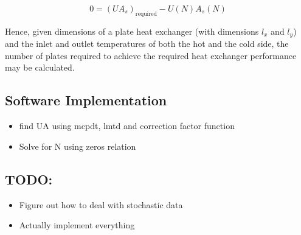 \documentclass[12pt,letterpaper]{article}
\begin{document}
\begin{equation}
\label{eq:zeros}
0 = (UA_s)_{\textrm{required}} - U(N) A_s(N)
\end{equation}

Hence, given dimensions of a plate heat exchanger (with dimensions \(l_x\) and \(l_y\)) and the inlet and outlet temperatures of both the hot and the cold side, the number of plates required to achieve the required heat exchanger performance may be calculated.

\subsection{Software Implementation}

\begin{itemize}
\item find UA using mcpdt, lmtd and correction factor function
\item Solve for N using zeros relation
\end{itemize}

\subsection{TODO:}
\begin{itemize}
\item Figure out how to deal with stochastic data
\item Actually implement everything
\end{itemize}
\end{document}
